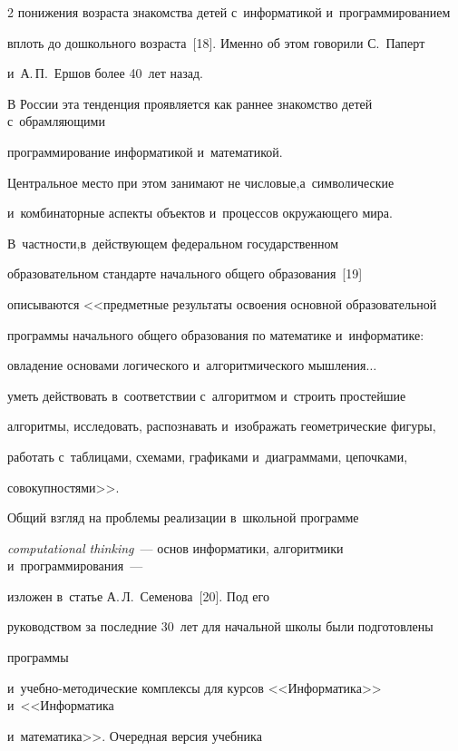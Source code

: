 \begin{multicols}{2}
понижения возраста знакомства детей с~информатикой и~программированием 


вплоть до дошкольного возраста~[18]. Именно об этом говорили С.~Паперт 


и~А.\,П.~Ершов более 40~лет назад.


  


  В России эта тенденция проявляется как раннее знакомство детей с~обрамляющими 


  программирование информатикой и~математикой. 


Цент\-раль\-ное место при этом занимают не числовые,\linebreak а~символические 


и~комбинаторные аспекты объектов и~процессов окружающего мира. 


В~част\-ности,\linebreak в~действующем федеральном государственном 


образовательном стандарте начального {общего} образования~[19] 


описываются <<предметные результаты освоения основной образовательной 


\mbox{программы} начального общего образования по математике и~информатике: 


овладение основами {логического} и~алгоритмического мышления$\ldots$\ 


уметь действовать в~соответствии с~алгоритмом и~строить простейшие 


алгоритмы, исследовать, распознавать и~изображать геометрические фигуры, 


работать с~таблицами, схемами, графиками и~диаграммами, цепочками, 


совокупностями>>.


  


  Общий взгляд на проблемы реализации в~школьной программе 


\textit{computational thinking}~--- основ информатики, алгоритмики и~программирования~---


 изложен в~статье А.\,Л.~Семенова~[20]. Под его 


руководством за последние 30~лет для начальной школы были подготовлены 


программы  


и~учеб\-но-ме\-то\-ди\-че\-ские комплексы для курсов <<Информатика>> и~<<Информатика 


и~математика>>. Очередная версия учебника 



\end{multicols}
